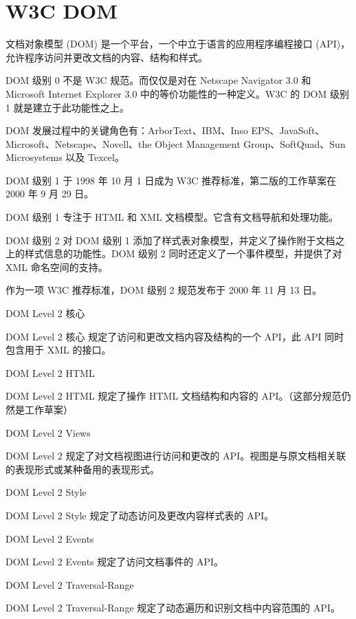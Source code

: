 \section{W3C DOM}


文档对象模型 (DOM) 是一个平台，一个中立于语言的应用程序编程接口 (API)，允许程序访问并更改文档的内容、结构和样式。


DOM 级别 0 不是 W3C 规范。而仅仅是对在 Netscape Navigator 3.0 和 Microsoft Internet Explorer 3.0 中的等价功能性的一种定义。W3C 的 DOM 级别 1 就是建立于此功能性之上。

DOM 发展过程中的关键角色有：ArborText、IBM、Inso EPS、JavaSoft、Microsoft、Netscape、Novell、the Object Management Group、SoftQuad、Sun Microsystems 以及 Texcel。



DOM 级别 1 于 1998 年 10 月 1 日成为 W3C 推荐标准，第二版的工作草案在 2000 年 9 月 29 日。

DOM 级别 1 专注于 HTML 和 XML 文档模型。它含有文档导航和处理功能。

DOM 级别 2 对 DOM 级别 1 添加了样式表对象模型，并定义了操作附于文档之上的样式信息的功能性。DOM 级别 2 同时还定义了一个事件模型，并提供了对 XML 命名空间的支持。

作为一项 W3C 推荐标准，DOM 级别 2 规范发布于 2000 年 11 月 13 日。

\begin{compactitem}
\item DOM Level 2 核心

DOM Level 2 核心 规定了访问和更改文档内容及结构的一个 API，此 API 同时包含用于 XML 的接口。

\item DOM Level 2 HTML

DOM Level 2 HTML 规定了操作 HTML 文档结构和内容的 API。（这部分规范仍然是工作草案）

\item DOM Level 2 Views

DOM Level 2 规定了对文档视图进行访问和更改的 API。视图是与原文档相关联的表现形式或某种备用的表现形式。

\item DOM Level 2 Style

DOM Level 2 Style 规定了动态访问及更改内容样式表的 API。

\item DOM Level 2 Events

DOM Level 2 Events 规定了访问文档事件的 API。

\item DOM Level 2 Traversal-Range

DOM Level 2 Traversal-Range 规定了动态遍历和识别文档中内容范围的 API。

\end{compactitem}


